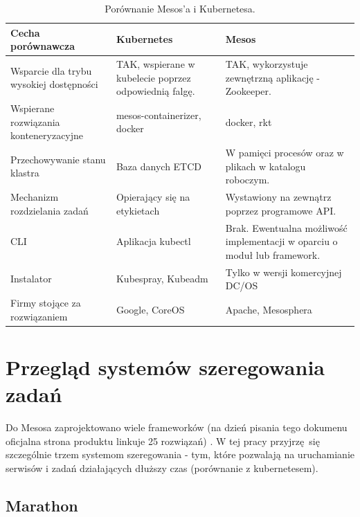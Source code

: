 \documentclass[10pt,a4paper,titlepage,twoside]{report}
\begin{document}
\begin{table}[!htbp]
\caption{Porównanie Mesos'a i Kubernetesa.}
\label{k8s_mesos_comparision}
\centering
\begin{tabular}{|p{4cm}|p{6cm}|p{6cm}|}
  \hline
  \textbf{Cecha porównawcza} & \textbf{Kubernetes} & \textbf{Mesos}\\
  \hline
  Wsparcie dla trybu wysokiej dostępności & TAK, wspierane w kubelecie poprzez odpowiednią falgę. & TAK, wykorzystuje zewnętrzną aplikację - Zookeeper. \\
  \hline
  Wspierane rozwiązania konteneryzacyjne & mesos-containerizer, docker & docker, rkt \\
  \hline
  Przechowywanie stanu klastra & Baza danych ETCD & W pamięci procesów oraz w plikach w katalogu roboczym. \\
  \hline
  Mechanizm rozdzielania zadań & Opierający się na etykietach & Wystawiony na zewnątrz poprzez programowe API. \\
  \hline
  CLI & Aplikacja kubectl & Brak. Ewentualna możliwość implementacji w oparciu o moduł lub framework. \\
  \hline
  Instalator & Kubespray, Kubeadm & Tylko w wersji komercyjnej DC/OS \\
  \hline
  Firmy stojące za rozwiązaniem & Google, CoreOS & Apache, Mesosphera \\
  \hline
\end{tabular}
\end{table}

\newpage

\section{Przegląd systemów szeregowania zadań}

Do Mesosa zaprojektowano wiele frameworków (na dzień pisania tego dokumenu oficjalna strona produktu linkuje 25 rozwiązań) \cite{ad41}. W tej pracy przyjrzę się szczególnie trzem systemom szeregowania - tym, które pozwalają na uruchamianie serwisów i zadań działających dłuższy czas (porównanie z kubernetesem). 

\subsection{Marathon}
\end{document}
